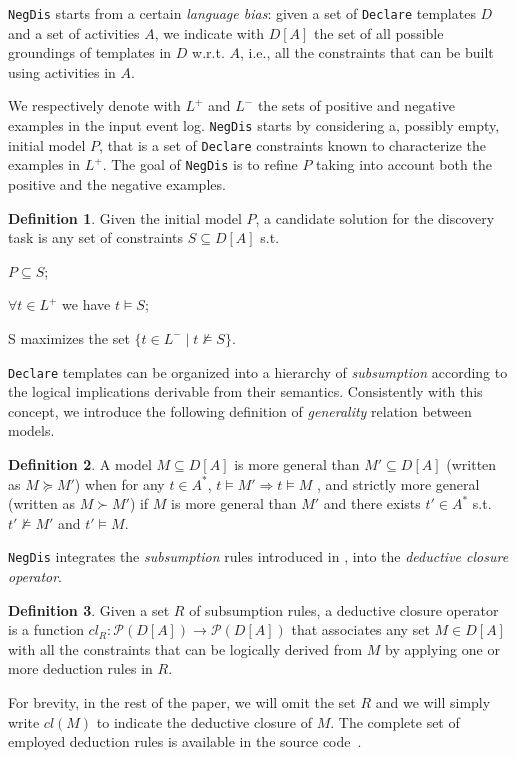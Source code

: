 \documentclass[letterpaper]{article} %
\theoremstyle{definition}
\newtheorem{definition}{Definition}
\newcommand{\nd}{\texttt{NegDis}\xspace}
\newcommand{\declare}{\texttt{Declare}\xspace}
\begin{document}
\nd starts from a certain \emph{language bias}: given a set of \declare templates $D$ and a set of activities $A$, we indicate with $D[A]$ the set of all possible groundings of templates in $D$ w.r.t. $A$, i.e., all the constraints that can be built using activities in $A$.

We respectively denote with $L^+$ and $L^-$ the sets of positive and negative examples %
in the input event log. \nd starts by considering a, possibly empty, initial model $P$, that is a set of \declare constraints known to characterize the examples in $L^+$. The goal of \nd is to refine $P$ taking into account both the positive and the negative examples.

\begin{definition}{}\label{def:cand}
Given the initial model $P$, a candidate solution for the discovery task is any set of constraints $S\subseteq D[A]$ s.t.
\begin{enumerate*} [label=\textit{(\roman*)}]
  \item $P\subseteq S$;
  \item $\forall t\in L^+$ we have $t\models S$;
  \item S maximizes the set $\{t\in L^-\mid t\not\models S\}$.
\end{enumerate*}
\end{definition}

\declare templates can be organized into a hierarchy of \emph{subsumption} \cite{2017-DiCiccio} according to the logical implications derivable from their semantics. Consistently with this concept, we introduce the following definition of \emph{generality} relation between models.
\begin{definition}{}\label{def:subs}
A model $M\subseteq D[A]$ is more general than $M'\subseteq D[A]$ (written as $M \succeq M'$) when for any $t\in A^*$, $t\models M' \Rightarrow t\models M$ , and strictly more general (written as $M \succ M'$) if $M$ is more general than $M'$ and there exists $t'\in A^*$ s.t.\ $t'\not\models M'$ and $t'\models M$.
\end{definition}

\nd integrates the \emph{subsumption} rules introduced in \cite{2017-DiCiccio}, into the \emph{deductive closure operator}.

\begin{definition}{}
Given a set $R$ of subsumption rules, a deductive closure operator is a function $cl_R: \mathcal{P}(D[A])\rightarrow\mathcal{P}(D[A])$ that associates any set $M \in D[A]$ with all the constraints that can be logically derived from $M$ by applying one or more deduction rules in $R$.
\end{definition}
For brevity, in the rest of the paper, we will omit the set $R$ and we will simply write $cl(M)$ to indicate the deductive closure of $M$. The complete set of employed deduction rules is available in the source code~\cite{zenodo:experiments}.
\end{document}
